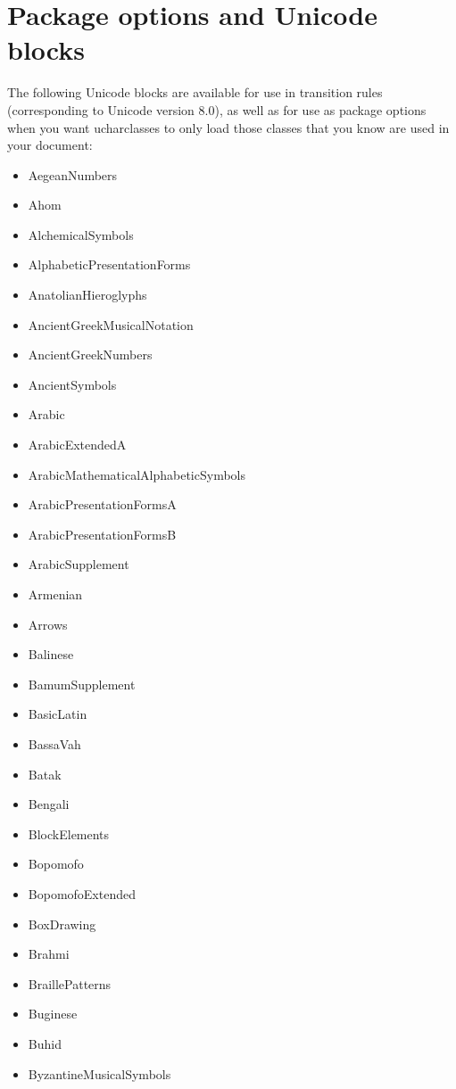 ﻿\documentclass{article}
\newenvironment{itemlist}{%
  \begin{itemize}
	\setlength{\itemsep}{0pt}
	\setlength{\parsep}{0pt}
	\setlength{\topsep}{0pt}
	\setlength{\partopsep}{0pt}
	\setlength{\parskip}{0pt}
	\setlength{\labelsep}{5pt}}%
{
  \end{itemize}}
\begin{document}
	\section{Package options and Unicode blocks}

		The following Unicode blocks are available for use in transition rules (corresponding to Unicode version 8.0), as well as for use as package options when you want ucharclasses to only load those classes that you know are used in your document:

		\begin{multicols}{2}
			\begin{itemlist}
				\item AegeanNumbers
				\item Ahom
				\item AlchemicalSymbols
				\item AlphabeticPresentationForms
				\item AnatolianHieroglyphs
				\item AncientGreekMusicalNotation
				\item AncientGreekNumbers
				\item AncientSymbols
				\item Arabic
				\item ArabicExtendedA
				\item ArabicMathematicalAlphabeticSymbols
				\item ArabicPresentationFormsA
				\item ArabicPresentationFormsB
				\item ArabicSupplement
				\item Armenian
				\item Arrows
				\item Balinese
				\item BamumSupplement
				\item BasicLatin
				\item BassaVah
				\item Batak
				\item Bengali
				\item BlockElements
				\item Bopomofo
				\item BopomofoExtended
				\item BoxDrawing
				\item Brahmi
				\item BraillePatterns
				\item Buginese
				\item Buhid
				\item ByzantineMusicalSymbols

\end{itemlist}
\end{multicols}
\end{document}
